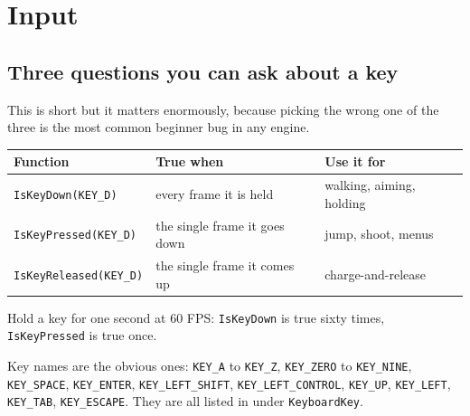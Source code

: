 \chapter{Input}

\section{Three questions you can ask about a key}

This is short but it matters enormously, because picking the wrong one of the
three is the most common beginner bug in any engine.

\begin{center}
\begin{tabular}{@{}lll@{}}
\toprule
\textbf{Function} & \textbf{True when} & \textbf{Use it for} \\
\midrule
\lstinline|IsKeyDown(KEY_D)| & every frame it is held & walking, aiming, holding \\
\lstinline|IsKeyPressed(KEY_D)| & the single frame it goes down & jump, shoot, menus \\
\lstinline|IsKeyReleased(KEY_D)| & the single frame it comes up & charge-and-release \\
\bottomrule
\end{tabular}
\end{center}

Hold a key for one second at 60 FPS: \lstinline|IsKeyDown| is true sixty times,
\lstinline|IsKeyPressed| is true once.


Key names are the obvious ones: \lstinline|KEY_A| to \lstinline|KEY_Z|,
\lstinline|KEY_ZERO| to \lstinline|KEY_NINE|, \lstinline|KEY_SPACE|,
\lstinline|KEY_ENTER|, \lstinline|KEY_LEFT_SHIFT|, \lstinline|KEY_LEFT_CONTROL|,
\lstinline|KEY_UP|, \lstinline|KEY_LEFT|, \lstinline|KEY_TAB|,
\lstinline|KEY_ESCAPE|. They are all listed in  under
\lstinline|KeyboardKey|.


